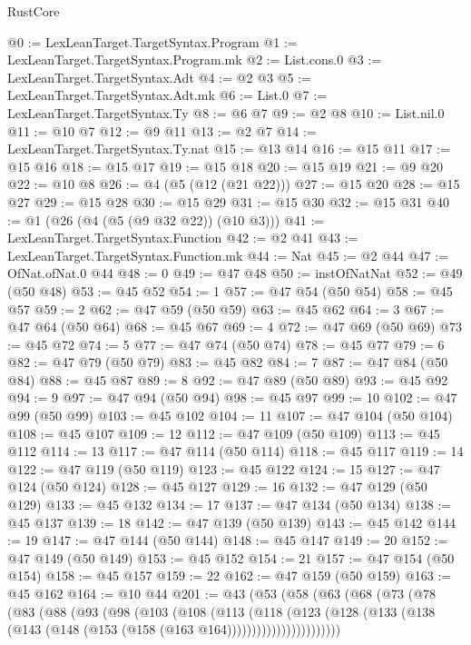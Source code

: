 \begin{lexlean}{RustCore}
\begin{coremodule}
@0 := LexLeanTarget.TargetSyntax.Program
@1 := LexLeanTarget.TargetSyntax.Program.mk
@2 := List.cons.{0}
@3 := LexLeanTarget.TargetSyntax.Adt
@4 := @2 @3
@5 := LexLeanTarget.TargetSyntax.Adt.mk
@6 := List.{0}
@7 := LexLeanTarget.TargetSyntax.Ty
@8 := @6 @7
@9 := @2 @8
@10 := List.nil.{0}
@11 := @10 @7
@12 := @9 @11
@13 := @2 @7
@14 := LexLeanTarget.TargetSyntax.Ty.nat
@15 := @13 @14
@16 := @15 @11
@17 := @15 @16
@18 := @15 @17
@19 := @15 @18
@20 := @15 @19
@21 := @9 @20
@22 := @10 @8
@26 := @4 (@5 (@12 (@21 @22)))
@27 := @15 @20
@28 := @15 @27
@29 := @15 @28
@30 := @15 @29
@31 := @15 @30
@32 := @15 @31
@40 := @1 (@26 (@4 (@5 (@9 @32 @22)) (@10 @3)))
@41 := LexLeanTarget.TargetSyntax.Function
@42 := @2 @41
@43 := LexLeanTarget.TargetSyntax.Function.mk
@44 := Nat
@45 := @2 @44
@47 := OfNat.ofNat.{0} @44
@48 := 0
@49 := @47 @48
@50 := instOfNatNat
@52 := @49 (@50 @48)
@53 := @45 @52
@54 := 1
@57 := @47 @54 (@50 @54)
@58 := @45 @57
@59 := 2
@62 := @47 @59 (@50 @59)
@63 := @45 @62
@64 := 3
@67 := @47 @64 (@50 @64)
@68 := @45 @67
@69 := 4
@72 := @47 @69 (@50 @69)
@73 := @45 @72
@74 := 5
@77 := @47 @74 (@50 @74)
@78 := @45 @77
@79 := 6
@82 := @47 @79 (@50 @79)
@83 := @45 @82
@84 := 7
@87 := @47 @84 (@50 @84)
@88 := @45 @87
@89 := 8
@92 := @47 @89 (@50 @89)
@93 := @45 @92
@94 := 9
@97 := @47 @94 (@50 @94)
@98 := @45 @97
@99 := 10
@102 := @47 @99 (@50 @99)
@103 := @45 @102
@104 := 11
@107 := @47 @104 (@50 @104)
@108 := @45 @107
@109 := 12
@112 := @47 @109 (@50 @109)
@113 := @45 @112
@114 := 13
@117 := @47 @114 (@50 @114)
@118 := @45 @117
@119 := 14
@122 := @47 @119 (@50 @119)
@123 := @45 @122
@124 := 15
@127 := @47 @124 (@50 @124)
@128 := @45 @127
@129 := 16
@132 := @47 @129 (@50 @129)
@133 := @45 @132
@134 := 17
@137 := @47 @134 (@50 @134)
@138 := @45 @137
@139 := 18
@142 := @47 @139 (@50 @139)
@143 := @45 @142
@144 := 19
@147 := @47 @144 (@50 @144)
@148 := @45 @147
@149 := 20
@152 := @47 @149 (@50 @149)
@153 := @45 @152
@154 := 21
@157 := @47 @154 (@50 @154)
@158 := @45 @157
@159 := 22
@162 := @47 @159 (@50 @159)
@163 := @45 @162
@164 := @10 @44
@201 := @43
    (@53
      (@58
        (@63
          (@68
            (@73
              (@78
                (@83
                  (@88
                    (@93
                      (@98
                        (@103
                          (@108
                            (@113
                              (@118
                                (@123
                                  (@128
                                    (@133
                                      (@138
                                        (@143 (@148 (@153 (@158 (@163 @164)))))))))))))))))))))))

\end{coremodule}
\end{lexlean}
